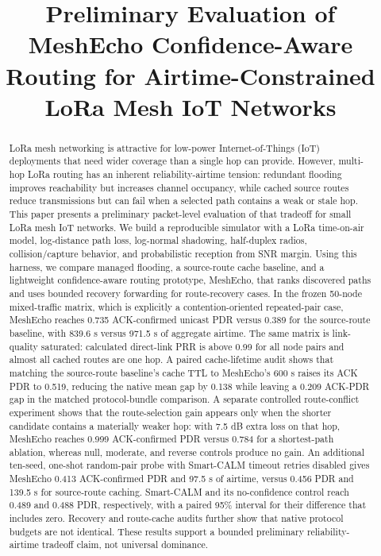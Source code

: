 \documentclass[conference]{IEEEtran}
\begin{document}
\title{Preliminary Evaluation of MeshEcho Confidence-Aware Routing for Airtime-Constrained LoRa Mesh IoT Networks}

\author{
}

\maketitle

\begin{abstract}
LoRa mesh networking is attractive for low-power Internet-of-Things (IoT)
deployments that need wider coverage than a single hop can provide. However,
multi-hop LoRa routing has an inherent reliability-airtime tension: redundant
flooding improves reachability but increases channel occupancy, while cached
source routes reduce transmissions but can fail when a selected path contains a
weak or stale hop. This paper presents a preliminary packet-level evaluation of
that tradeoff for small LoRa mesh IoT networks. We build a reproducible
simulator with a LoRa time-on-air model, log-distance path loss, log-normal
shadowing, half-duplex radios, collision/capture behavior, and probabilistic
reception from SNR margin. Using this harness, we compare managed flooding, a
    source-route cache baseline, and a lightweight confidence-aware routing
    prototype, MeshEcho, that ranks discovered paths and uses bounded recovery
    forwarding for route-recovery cases. In the frozen 50-node mixed-traffic
    matrix, which is explicitly a contention-oriented repeated-pair case,
    MeshEcho reaches 0.735 ACK-confirmed unicast PDR versus 0.389 for the
    source-route baseline, with 839.6 s versus 971.5 s of aggregate airtime.
    The same matrix is link-quality saturated: calculated direct-link PRR is
    above 0.99 for all node pairs and almost all cached routes are one hop. A
    paired cache-lifetime audit shows that matching the source-route baseline's
    cache TTL to MeshEcho's 600 s raises its ACK PDR to 0.519, reducing the
    native mean gap by 0.138 while leaving a 0.209 ACK-PDR gap in the matched
    protocol-bundle comparison.
    A separate
    controlled route-conflict experiment shows that the route-selection gain
    appears only when the shorter candidate contains a materially weaker hop:
    with 7.5 dB extra loss on that hop, MeshEcho reaches 0.999 ACK-confirmed
    PDR versus 0.784 for a shortest-path ablation, whereas null, moderate, and
    reverse controls produce no gain. An additional ten-seed, one-shot
    random-pair probe with Smart-CALM timeout retries disabled gives MeshEcho
    0.413 ACK-confirmed PDR and 97.5 s of airtime, versus 0.456 PDR and 139.5 s
    for source-route caching. Smart-CALM and its no-confidence control reach
    0.489 and 0.488 PDR, respectively, with a paired 95\% interval for their
    difference that includes zero. Recovery and route-cache audits further show
    that native protocol budgets are not identical. These results support a
    bounded preliminary reliability-airtime tradeoff claim, not universal
    dominance.
\end{abstract}
\end{document}
